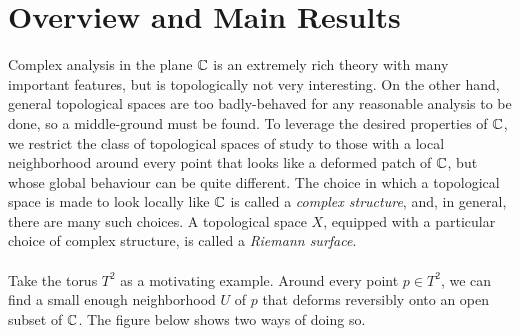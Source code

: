 \documentclass[../Moduli_Spaces_of_Riemann_Surfaces.tex]{subfiles}
\begin{document}
    \section{Overview and Main Results}
    Complex analysis in the plane $\mathbb{C}$ is an extremely rich theory with many important features, but is topologically not very interesting. On the other hand, general topological spaces are too badly-behaved for any reasonable analysis to be done, so a middle-ground must be found. To leverage the desired properties of $\mathbb{C}$, we restrict the class of topological spaces of study to those with a local neighborhood around every point that looks like a deformed patch of $\mathbb{C}$, but whose global behaviour can be quite different. The choice in which a topological space is made to look locally like $\mathbb{C}$ is called a \textit{complex structure}, and, in general, there are many such choices. A topological space $X$, equipped with a particular choice of complex structure, is called a \textit{Riemann surface}.\\\ \\
    Take the torus $T^2$ as a motivating example. Around every point $p\in T^2$, we can find a small enough neighborhood $U$ of $p$ that deforms reversibly onto an open subset of $\mathbb{C}$. The figure below shows two ways of doing so.
\end{document}
